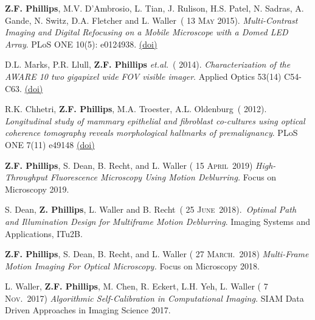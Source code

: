 \documentclass[12pt,letterpaper]{article}
\newcommand{\mhead}[1]{\leavevmode\marginpar{\sffamily\footnotesize #1}}
\renewcommand{\date}[1]{{} #1}
\begin{document}
\medskip
\textbf{Z.F. Phillips}, M.V. D'Ambrosio, L. Tian, J. Rulison, H.S. Patel, N. Sadras, A. Gande, N. Switz, \linebreak D.A. Fletcher and L. Waller~(\date{13 \textsc{May} 2015}).
\emph{Multi-Contrast Imaging and Digital Refocusing on a Mobile  \linebreak Microscope with a Domed LED Array}.
PLoS ONE 10(5): e0124938. \href{http://journals.plos.org/plosone/article?id=10.1371/journal.pone.0124938}{(doi)}

\medskip
\par D.L. Marks, P.R. Llull, \textbf{Z.F. Phillips} \textit{et.al.}~(\date{2014}).
\emph{Characterization of the AWARE 10 two gigapixel wide FOV visible imager}.
Applied Optics 53(14) C54-C63.  \href{https://www.osapublishing.org/ao/abstract.cfm?uri=ao-53-13-C54}{(doi)}

\medskip
R.K. Chhetri, \textbf{Z.F. Phillips}, M.A. Troester, A.L. Oldenburg~(\date{2012}).
\emph{Longitudinal study of mammary \linebreak epithelial and fibroblast co-cultures using optical coherence tomography reveals morphological  \linebreak hallmarks of premalignancy}.
PLoS ONE 7(11) e49148  \href{http://journals.plos.org/plosone/article?id=10.1371/journal.pone.0049148}{(doi)}

\medskip

\medskip
\mhead{Conference Presentations}%

\par\vspace{-\baselineskip}

\textbf{Z.F. Phillips}, S. Dean, B. Recht, and L. Waller (\date{15 \textsc{April}~2019})
\emph{High-Throughput Fluorescence  \linebreak Microscopy Using Motion Deblurring.} Focus on Microscopy 2019.
\medskip

S. Dean, \textbf{Z. Phillips}, L. Waller and B. Recht~(\date{25 \textsc{June}~2018}).~\emph{Optimal Path and Illumination Design for Multiframe Motion Deblurring}.
Imaging Systems and Applications, ITu2B.
\medskip

\textbf{Z.F. Phillips}, S. Dean, B. Recht, and L. Waller (\date{27 \textsc{March.}~2018})
\emph{Multi-Frame Motion Imaging For  \linebreak Optical Microscopy.} Focus on Microscopy 2018.
\medskip

L. Waller, \textbf{Z.F. Phillips}, M. Chen, R. Eckert, L.H. Yeh, L. Waller (\date{7 \textsc{Nov.}~2017})
\emph{Algorithmic  \linebreak Self-Calibration in Computational Imaging.} SIAM Data Driven Approaches in Imaging Science 2017.
\end{document}
